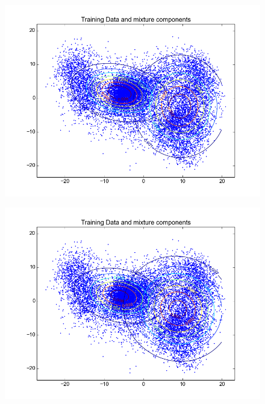 \documentclass[11pt,a4paper]{article}
\begin{document}
\begin{minipage}[b]{0.25\textwidth}
\begin{figure}[H]
  \centering
  \includegraphics[width=.8\linewidth]{Figures/contours_digitseven15.png}

  \label{fig:sfig1}
\end{figure}%
\end{minipage}
\begin{minipage}[b]{0.25\textwidth}
\begin{figure}[H]
  \centering
  \includegraphics[width=.8\linewidth]{Figures/contours_digitseven20.png}

  \label{fig:sfig1}
\end{figure}%
\end{minipage}
\end{document}
